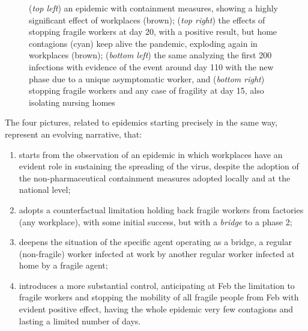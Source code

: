 \documentclass[graybox]{svmult}
\begin{document}
\begin{figure}[t]
\caption{(\emph{top left}) an epidemic with containment measures, showing a highly significant effect of workplaces (brown);
 (\emph{top right}) the effects of stopping fragile workers at day 20, with a positive result, but home contagions (cyan) keep alive the pandemic, exploding again in workplaces (brown); (\emph{bottom left}) the same analyzing the first 200 infections with evidence of the event around day 110 with the new phase due to a unique asymptomatic worker, and (\emph{bottom right}) stopping fragile workers and any case of fragility at day 15, also isolating nursing homes} 
\label{fourSequences}
\end{figure}

The four pictures, related to epidemics starting precisely in the same way, represent an evolving narrative, that:

\begin{enumerate}

\item starts from the observation of an epidemic in which workplaces have an evident role in sustaining the spreading of the virus, despite the adoption of the non-pharmaceutical containment measures adopted locally and at the national level;

\item adopts a counterfactual limitation holding back fragile workers from factories (any workplace), with some initial success, but with a \emph{bridge} to a phase 2;

\item\label{micromicro} deepens the situation of the specific agent operating as a bridge, a regular (non-fragile) worker infected at work by another regular worker infected at home by a fragile agent;

\item introduces a more substantial  control, anticipating at Feb  the limitation to fragile workers and stopping the mobility of all fragile people from Feb  with evident positive effect, having the whole epidemic very few contagions and lasting a limited number of days.

\end{enumerate}
\end{document}
